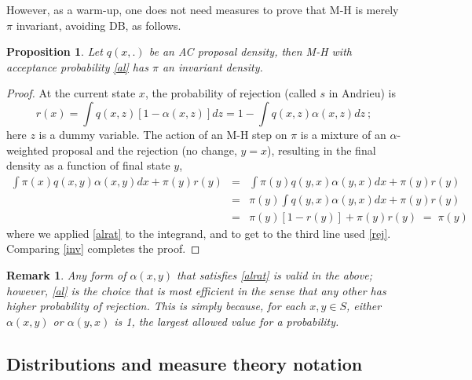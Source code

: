 \documentclass[10pt]{article}
\newcommand{\be}{\begin{equation}}
\newcommand{\ee}{\end{equation}}
\newcommand{\bea}{\begin{eqnarray}}
\newcommand{\eea}{\end{eqnarray}}
\newtheorem{pro}[thm]{Proposition}
\newtheorem{rmk}[thm]{Remark}
\newcommand{\al}{\alpha}
\begin{document}
However, as a warm-up, one does not need measures to prove that M-H is merely
$\pi$ invariant, avoiding DB, as follows.
\begin{pro}
  Let $q(x,.)$ be an AC proposal density, then M-H with acceptance probability
  \eqref{al} has $\pi$ an invariant density.
  \label{p:mhinv}
\end{pro}
\begin{proof}
  At the current state $x$, the probability of rejection
  (called $s$ in Andrieu) is
  \be
  r(x) = \int q(x,z) [1-\al(x,z)] dz  = 1 - \int q(x,z) \al(x,z) dz~;
  \label{rej}
  \ee
  here $z$ is a dummy variable.
  The action of an M-H step on $\pi$ is a mixture of an $\al$-weighted proposal
  and the rejection (no change, $y=x$),
  resulting in the final density as a function of final state $y$,
  \bea
  \int \pi(x) q(x,y)\al(x,y) dx + \pi(y) r(y)
  &=& \int \pi(y) q(y,x)\al(y,x) dx + \pi(y) r(y)
  \nonumber \\
  &=& \pi(y) \int q(y,x)\al(y,x) dx + \pi(y) r(y)
  \nonumber \\
  &=& \pi(y) [1-r(y)] + \pi(y) r(y) \; = \; \pi(y)
  \nonumber
\eea
where we applied \eqref{alrat} to the integrand,
and to get to the third line used \eqref{rej}.
Comparing \eqref{inv} completes the proof.
\end{proof}

\begin{rmk}
Any form of $\al(x,y)$ that satisfies \eqref{alrat} is valid
in the above; however, \eqref{al} is the choice that is most efficient
in the sense that any other has higher probability of rejection.
This is simply because, for each $x,y\in S$,
either $\al(x,y)$ or $\al(y,x)$ is 1, the largest
allowed value for a probability.
\end{rmk}


\subsection{Distributions and measure theory notation}
\end{document}
